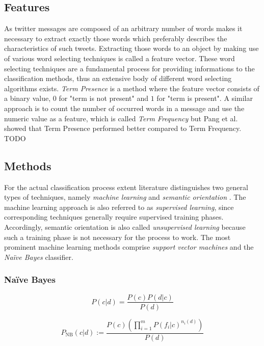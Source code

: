 \subsection{Features}
As twitter messages are composed of an arbitrary number of words makes it necessary to extract exactly those words which preferably describes the characteristics of such tweets. Extracting those words to an object by making use of various word selecting techniques is called a feature vector. These word selecting techniques are a fundamental process for providing informations to the classification methods, thus an extensive body of different word selecting algorithms exists. 
	\emph{Term Presence} is a method where the feature vector consists of a binary value, $0$ for "term is not present" and $1$ for "term is present". A similar approach is to count the number of occurred words in a message and use the numeric value as a feature, which is called \emph{Term Frequency} but Pang et al. showed \autocite{Pang2008} that Term Presence performed better compared to Term Frequency.
TODO

\subsection{Methods}

For the actual classification process extent literature distinguishes two general types of techniques, namely \emph{machine learning} and \emph{semantic orientation} \cite{Ye20096527}. The machine learning approach is also referred to as \emph{supervised learning}, since corresponding techniques generally require supervised training phases. Accordingly, semantic orientation is also called \emph{unsupervised learning} because such a training phase is not necessary for the process to work. The most prominent machine learning methods comprise \emph{support vector machines} and the \emph{Na\"ive Bayes} classifier.

\subsubsection*{Na\"ive Bayes}



\begin{equation*}
P(c \vert d) = \frac{P(c)P(d \vert c)}{P(d)}
\end{equation*}

\begin{equation*}
P_{\mathrm{NB}}(c \vert d) := \frac{P(c)(\prod^{m}_{i=1}P(f_i \vert c)^{n_i(d)})}{P(d)}
\end{equation*}

